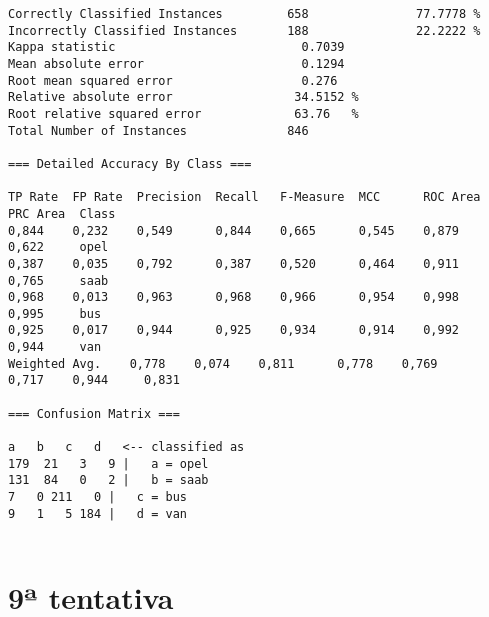 \documentclass[
	article,			%
	11pt,				%
	oneside,			%
	a4paper,			%
	english,			%
	brazil,				%
	sumario=tradicional
	]{abntex2}
\begin{document}
\begin{lstlisting}
Correctly Classified Instances         658               77.7778 %
Incorrectly Classified Instances       188               22.2222 %
Kappa statistic                          0.7039
Mean absolute error                      0.1294
Root mean squared error                  0.276 
Relative absolute error                 34.5152 %
Root relative squared error             63.76   %
Total Number of Instances              846     

=== Detailed Accuracy By Class ===

TP Rate  FP Rate  Precision  Recall   F-Measure  MCC      ROC Area  PRC Area  Class
0,844    0,232    0,549      0,844    0,665      0,545    0,879     0,622     opel
0,387    0,035    0,792      0,387    0,520      0,464    0,911     0,765     saab
0,968    0,013    0,963      0,968    0,966      0,954    0,998     0,995     bus
0,925    0,017    0,944      0,925    0,934      0,914    0,992     0,944     van
Weighted Avg.    0,778    0,074    0,811      0,778    0,769      0,717    0,944     0,831     

=== Confusion Matrix ===

a   b   c   d   <-- classified as
179  21   3   9 |   a = opel
131  84   0   2 |   b = saab
7   0 211   0 |   c = bus
9   1   5 184 |   d = van


\end{lstlisting}

\newpage

\section{9ª tentativa}
\end{document}
